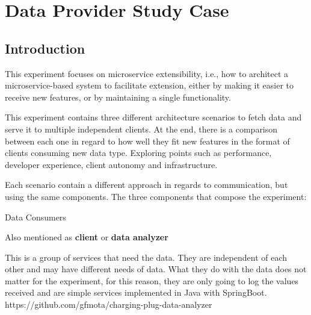 

\newcommand{\sla}{\textbackslash}

\newcommand{\cmd}[1]{\textsf{#1}}

\newcommand{\pkg}[1]{\textsf{#1}}

\newcommand{\ltxcmd}[1]{\cmd{\sla{}#1}}

\chapter{Data Provider Study Case}
\label{chap:dataprovider}

\section{Introduction}
\label{sec:introductionprov}

This experiment focuses on microservice extensibility, i.e., how to architect a microservice-based system to facilitate extension, either by making it easier to receive new features, or by maintaining a single functionality. 

This experiment contains three different architecture scenarios to fetch data and serve it to multiple independent clients. At the end, there is a comparison between each one in regard to how well they fit new features in the format of clients consuming new data type. Exploring points such as performance, developer experience, client autonomy and infrastructure.

Each scenario contain a different approach in regards to communication, but using the same components. The three components that compose the experiment:

{Data Consumers}
\label{sec:dataconsumer}

Also mentioned as \textbf{client} or \textbf{data analyzer}

This is a group of services that need the data. They are independent of each other and may have different needs of data. What they do with the data does not matter for the experiment, for this reason, they are only going to log the values received and are simple services implemented in Java with SpringBoot. https://github.com/gfmota/charging-plug-data-analyzer

